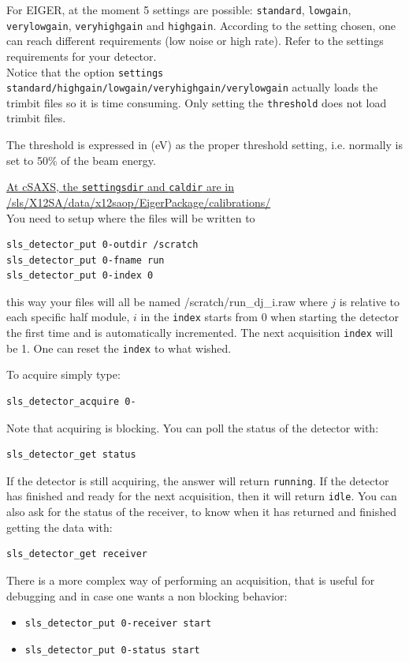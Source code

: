 \documentclass{article}
\newcommand{\E}{EIGER\xspace}
\begin{document}
For \E, at the moment 5 settings are possible: {\tt{standard}}, {\tt{lowgain}}, {\tt{verylowgain}}, {\tt{veryhighgain}} and {\tt{highgain}}. According to the setting chosen, one can reach different requirements (low noise or high rate). Refer to the settings requirements for your detector.\\ 
Notice that the option {\tt{settings standard/highgain/lowgain/veryhighgain/verylowgain}} actually loads the trimbit files so it is time consuming. Only setting the {\tt{threshold}} does not load trimbit files.  

The threshold is expressed in (eV) as the proper threshold setting, i.e. normally is set to 50\% of the beam energy.  

\underline{At cSAXS, the {\tt{settingsdir}} and {\tt{caldir}} are in}\\\underline{/sls/X12SA/data/x12saop/EigerPackage/calibrations/}\\ 

You need to setup where the files will be written to
\begin{verbatim}
sls_detector_put 0-outdir /scratch
sls_detector_put 0-fname run
sls_detector_put 0-index 0
\end{verbatim}
this way your files will all be named /scratch/run\_dj\_i.raw where $j$ is relative to each specific half module, $i$ in the {\tt{index}} starts from 0 when starting the detector the first time and is automatically incremented. The next acquisition {\tt{index}} will be 1. One can reset the  {\tt{index}} to what wished.

To acquire simply type:
\begin{verbatim}
sls_detector_acquire 0-
\end{verbatim}
Note that acquiring is blocking.
You can poll the status of the detector with:
\begin{verbatim}
sls_detector_get status
\end{verbatim}
If the detector is still acquiring, the answer will return {\tt{running}}. If the detector has finished and ready for the next acquisition, then it will return {\tt{idle}}.
You can also ask for the status of the receiver, to know when it has returned and finished getting the data with:
\begin{verbatim}
sls_detector_get receiver
\end{verbatim}

There is a more complex way of performing an acquisition, that is useful for debugging and in case one wants a non blocking behavior: 
\begin{itemize}
\item {\tt{sls\_detector\_put 0-receiver start}} 
\item {\tt{sls\_detector\_put 0-status start}} 
\end{itemize}
\end{document}
